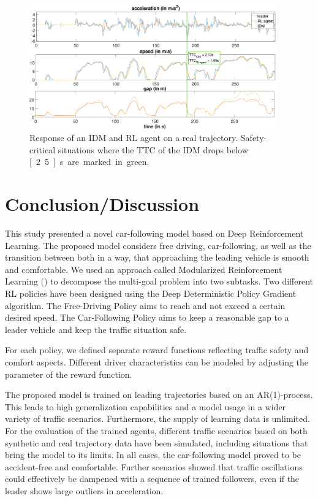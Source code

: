 \documentclass[review]{elsarticle}
\providecommand{\martin}[1]{#1}                  %
\providecommand{\martinc}[1]{}                  %
\providecommand{\3}{{\ss}}
\begin{document}
\begin{figure}	
	\centering
	\includegraphics[width=0.95\textwidth]{images/TTC_CaseStudy}
	\caption{Response of an IDM and RL agent on a real trajectory. Safety-critical situations where the TTC of the IDM drops below \unit[2.5]{s} are marked in green.}
	\label{fig:TTC_CaseStudy}
\end{figure}

\section{Conclusion/Discussion}
\label{sec:conclusion}
This study presented a novel car-following model based on
\martin{Deep Reinforcement Learning}. \martinc{Die Conclusion wird
  bisweilen separat gelesen, so besser (wie immer im Abstract) keine
  Abk\"urzungen verwenden, au\3er die allergebr\"auchlichsten} The
proposed model considers free driving, car-following, as well as the
transition between both in a way, that approaching the leading vehicle
is smooth and comfortable. We used an approach called Modularized
Reinforcement Learning (\cite{MRL}) to decompose the multi-goal
problem into two subtasks. Two different RL policies have been
designed using the Deep Deterministic Policy Gradient algorithm. The
Free-Driving Policy \martin{aims to reach and not exceed a certain
desired speed.} The Car-Following Policy aims to keep a reasonable gap
to a leader vehicle \martin{and keep the traffic situation safe.} 

For each policy, we defined separate reward functions \martin{reflecting} traffic safety and comfort aspects. 
Different driver characteristics can be modeled by adjusting the parameter of the reward function.

The proposed model is trained on leading trajectories based on an
AR(1)-process. This leads to high generalization capabilities and a
model usage in a wider variety of traffic scenarios. \martin{Furthermore, the
supply of learning data is unlimited.}
For the evaluation of the trained agents, different traffic scenarios
\martin{based on both synthetic and
real trajectory data have been simulated, including situations that
bring the model} to its limits. 
In all cases, the car-following model proved to be accident-free and
comfortable. Further scenarios showed that traffic oscillations could
effectively be dampened with a sequence of trained followers, even if
the leader shows large outliers in acceleration.
\end{document}
